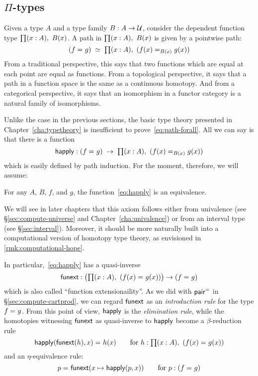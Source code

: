 \subsection{$\Pi$-types}
\label{sec:compute-pi}

Given a type $A$ and a type family $B : A \to \mathcal{U}$, consider the dependent function type $\prd{x:A}B(x)$.
A path in $\prd{x:A} B(x)$ is given by a pointwise path:
\begin{equation}
  \eqvspaced{(\id{f}{g})}{\prd{x:A} (\id[B(x)]{f(x)}{g(x)})}\label{eq:path-forall}
\end{equation}
From a traditional perspective, this says that two functions which are equal at each point are equal as functions.
From a topological perspective, it says that a path in a function space is the same as a continuous homotopy.
And from a categorical perspective, it says that an isomorphism in a functor category is a natural family of isomorphisms.

Unlike the case in the previous sections, the basic type theory presented in Chapter~\ref{cha:typetheory} is insufficient to prove~\eqref{eq:path-forall}.
All we can say is that there is a function
\begin{equation}
  \happly : {(\id{f}{g})}\;\to\; {\prd{x:A} (\id[B(x)]{f(x)}{g(x)})}\label{eq:happly}
\end{equation}
which is easily defined by path induction.
For the moment, therefore, we will assume:

\begin{axiom}
  For any $A$, $B$, $f$, and $g$, the function~\eqref{eq:happly} is an equivalence.
\end{axiom}

We will see in later chapters that this axiom follows either from univalence (see \S\ref{sec:compute-universe} and Chapter~\ref{cha:univalence}) or from an interval type (see \S\ref{sec:interval}).
Moreover, it should be more naturally built into a computational version of homotopy type theory, as envisioned in \autoref{rmk:computational-hope}.

In particular,~\eqref{eq:happly} has a quasi-inverse
\[
\funext : \big(\prd{x:A} (\id{f(x)}{g(x)})\big) \to {(\id{f}{g})}
\]
which is also called ``function extensionaility''.
As we did with $\mathsf{pair}^{\mathord{=}}$ in \S\ref{sec:compute-cartprod}, we can regard $\mathsf{funext}$ as an \emph{introduction rule} for the type $f =_{} g$.
From this point of view, $\mathsf{happly}$ is the \emph{elimination rule}, while the homotopies witnessing $\mathsf{funext}$ as quasi-inverse to $\mathsf{happly}$ become a $\beta$-reduction rule
\[
\id{\happly({\funext{(h)}},x)}{h(x)} \qquad\text{for }h:\prd{x:A} (\id{f(x)}{g(x)})
\]
and an $\eta$-equivalence rule:
\[
p =_{} \mathsf{funext} (x \mapsto \mathsf{happly}(p,{x})) \qquad\text{for } p: (f =_{} g)
\]

